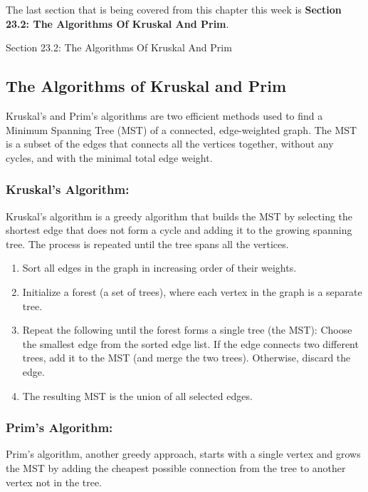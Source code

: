The last section that is being covered from this chapter this week is \textbf{Section 23.2: The Algorithms Of Kruskal And Prim}.

\begin{notes}{Section 23.2: The Algorithms Of Kruskal And Prim}
    \subsection*{The Algorithms of Kruskal and Prim}

    Kruskal's and Prim's algorithms are two efficient methods used to find a Minimum Spanning Tree (MST) of a connected, edge-weighted graph. The MST is a subset of the edges that connects all the 
    vertices together, without any cycles, and with the minimal total edge weight. \vspace*{1em}
    
    \subsubsection*{Kruskal's Algorithm:}

    Kruskal's algorithm is a greedy algorithm that builds the MST by selecting the shortest edge that does not form a cycle and adding it to the growing spanning tree. The process is repeated until 
    the tree spans all the vertices.

    \begin{enumerate}
        \item Sort all edges in the graph in increasing order of their weights.
        \item Initialize a forest (a set of trees), where each vertex in the graph is a separate tree.
        \item Repeat the following until the forest forms a single tree (the MST): Choose the smallest edge from the sorted edge list. If the edge connects two different trees, add it to the MST (and merge the two trees). Otherwise, discard the edge.
        \item The resulting MST is the union of all selected edges.
    \end{enumerate}
    
    \subsubsection*{Prim's Algorithm:}

    Prim's algorithm, another greedy approach, starts with a single vertex and grows the MST by adding the cheapest possible connection from the tree to another vertex not in the tree.
    

\end{notes}
